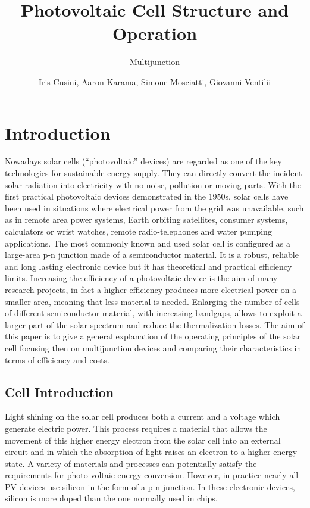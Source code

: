 \documentclass[11pt]{article} %
\title{Photovoltaic Cell Structure and Operation}
\subtitle{Multijunction}
\author{Iris Cusini, Aaron Karama, Simone Mosciatti, Giovanni Ventilii}
\begin{document}
\maketitle

\section{Introduction}

Nowadays solar cells (``photovoltaic'' devices) are regarded as one of the key technologies for sustainable energy supply. They can directly convert the incident solar radiation into electricity with no noise, pollution or moving parts. With the first practical photovoltaic devices demonstrated in the 1950s, solar cells have been used in situations where electrical power from the grid was unavailable, such as in remote area power systems, Earth orbiting satellites, consumer systems, calculators or wrist watches, remote radio-telephones and water pumping applications. The most commonly known and used solar cell is configured as a large-area p-n junction made of a semiconductor material. It is a robust, reliable and long lasting electronic device but it has theoretical and practical efficiency limits. Increasing the efficiency of a photovoltaic device is the aim of  many  research  projects, in fact a higher efficiency produces more electrical power on a smaller area, meaning that  less material is needed. Enlarging the number of cells of different semiconductor material, with increasing bandgaps, allows to exploit a larger part of the solar spectrum and reduce the thermalization losses. The aim of this paper is to give a general explanation of the operating principles of the solar cell focusing then on multijunction devices and comparing their characteristics in terms of efficiency and costs.

\subsection{Cell Introduction}

Light shining on the solar cell produces both a current and a voltage which generate electric power. This process requires a material that allows the movement of this higher energy electron from the solar cell into an external circuit and in which  the absorption of light raises an electron to a higher energy state. A variety of materials and processes can potentially satisfy the requirements for photo-voltaic energy conversion. However, in practice nearly all PV devices use silicon in the form of a p-n junction. In these electronic devices, silicon is more doped than the one normally used in chips.
\end{document}
